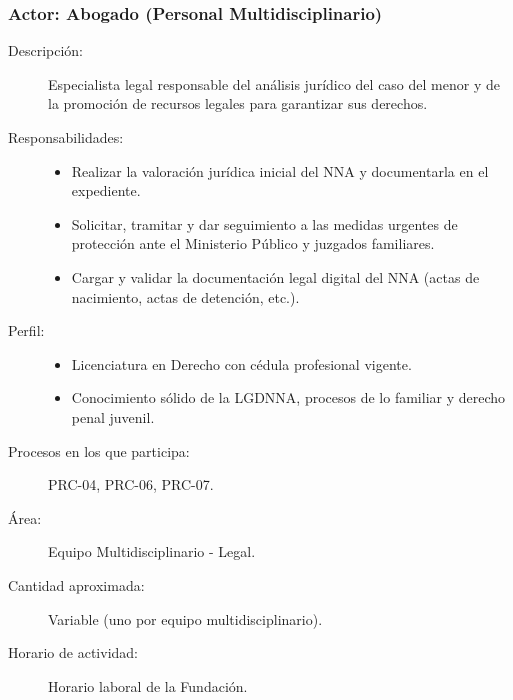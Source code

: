\subsubsection{Actor: Abogado (Personal Multidisciplinario)}
\begin{description}
	\item[Descripción:] Especialista legal responsable del análisis jurídico del caso del menor y de la promoción de recursos legales para garantizar sus derechos.
	\item[Responsabilidades:] \cdtEmpty
		\begin{itemize}
			\item Realizar la valoración jurídica inicial del NNA y documentarla en el expediente.
			\item Solicitar, tramitar y dar seguimiento a las medidas urgentes de protección ante el Ministerio Público y juzgados familiares.
			\item Cargar y validar la documentación legal digital del NNA (actas de nacimiento, actas de detención, etc.).
		\end{itemize}
	\item[Perfil:] \cdtEmpty
		\begin{itemize}
			\item Licenciatura en Derecho con cédula profesional vigente.
			\item Conocimiento sólido de la LGDNNA, procesos de lo familiar y derecho penal juvenil.
		\end{itemize}
	\item[Procesos en los que participa:] PRC-04, PRC-06, PRC-07.
	\item[Área:] Equipo Multidisciplinario - Legal.
	\item[Cantidad aproximada:] Variable (uno por equipo multidisciplinario).
	\item[Horario de actividad:] Horario laboral de la Fundación.
\end{description}

